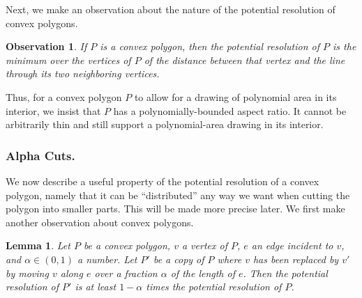 \documentclass[11pt]{article}
\newtheorem {observation} {Observation}
\newtheorem {lemma} {Lemma}
\renewcommand{\subsection}[1]{\subsubsection{#1.}}
\begin{document}
    Next, we make an observation about the nature of the potential resolution of
    convex polygons.


    \begin {observation} \label {obs:convex-easier}
      If $P$ is a convex polygon, then the potential resolution of $P$ is the
      minimum over the vertices of $P$ of the distance between that vertex and the
      line through its two neighboring vertices.
    \end {observation}



    Thus, for a convex polygon $P$ to allow for a drawing of polynomial
    area in its interior, we insist that
    $P$ has a polynomially-bounded aspect ratio. It cannot be
    arbitrarily thin and still support a polynomial-area drawing in its
    interior.

  \subsection {Alpha Cuts}

    We now describe a useful property of the potential resolution of a convex
    polygon, namely that it can be ``distributed'' any way we want when cutting 
    the polygon into smaller parts.
    This will be made more precise later.
    We first make another observation about convex polygons.
    
    \begin {lemma} \label {lem:move-vertex}
      Let $P$ be a convex polygon, $v$ a vertex of $P$, $e$ an edge incident to $v
      $, and $\alpha \in (0, 1)$ a number. Let $P'$ be a copy of $P$ where $v$
      has been replaced by $v'$ by moving $v$ along $e$ over a fraction $\alpha$
      of the length of $e$. Then the potential resolution of $P'$ is at least $1 -
      \alpha$ times the potential resolution of $P$.
    \end {lemma}
\end{document}
